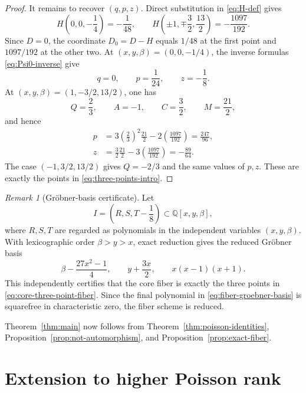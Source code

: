 \documentclass[11pt]{article}
\newcommand{\Q}{\mathbb Q}
\theoremstyle{remark}
\newtheorem{remark}[theorem]{Remark}
\begin{document}
\begin{proof}
It remains to recover \((q,p,z)\).  Direct substitution in
\eqref{eq:H-def} gives
\begin{equation}\label{eq:H-fiber-values}
  H\left(0,0,-\frac14\right)=-\frac1{48},
  \qquad
  H\left(\pm1,\mp\frac32,\frac{13}{2}\right)
  =-\frac{1097}{192}.
\end{equation}
Since \(D=0\), the coordinate \(D_0=D-H\) equals \(1/48\) at the first
point and \(1097/192\) at the other two.  At
\((x,y,\beta)=(0,0,-1/4)\), the inverse formulas
\eqref{eq:Psi0-inverse} give
\[
  q=0,
  \qquad
  p=\frac1{24},
  \qquad
  z=-\frac18.
\]
At \((x,y,\beta)=(1,-3/2,13/2)\), one has
\[
  Q=\frac23,
  \qquad
  A=-1,
  \qquad
  C=\frac32,
  \qquad
  M=\frac{21}{2},
\]
and hence
\begin{align*}
  p&=3\left(\frac23\right)^2\frac{21}{2}
      -2\left(\frac{1097}{192}\right)
     =\frac{247}{96},\\
  z&=\frac32\frac{21}{2}
      -3\left(\frac{1097}{192}\right)
     =-\frac{89}{64}.
\end{align*}
The case \((-1,3/2,13/2)\) gives \(Q=-2/3\) and the same values of
\(p,z\).  These are exactly the points in \eqref{eq:three-points-intro}.
\end{proof}

\begin{remark}[Gr\"obner-basis certificate]\label{rem:fiber-groebner}
Let
\[
  I=\left(R,S,T-\frac18\right)\subset\Q[x,y,\beta],
\]
where \(R,S,T\) are regarded as polynomials in the independent variables
\((x,y,\beta)\).  With lexicographic order \(\beta>y>x\), exact reduction gives
the reduced Gr\"obner basis
\begin{equation}\label{eq:fiber-groebner-basis}
  \beta-\frac{27x^2-1}{4},
  \qquad
  y+\frac{3x}{2},
  \qquad
  x(x-1)(x+1).
\end{equation}
This independently certifies that the core fiber is exactly the three points
in \eqref{eq:core-three-point-fiber}.  Since the final polynomial in
\eqref{eq:fiber-groebner-basis} is squarefree in characteristic zero, the fiber
scheme is reduced.
\end{remark}

Theorem~\ref{thm:main} now follows from
Theorem~\ref{thm:poisson-identities}, Proposition~\ref{prop:not-automorphism},
and Proposition~\ref{prop:exact-fiber}.

\section{Extension to higher Poisson rank}\label{sec:higher-ranks}
\end{document}
